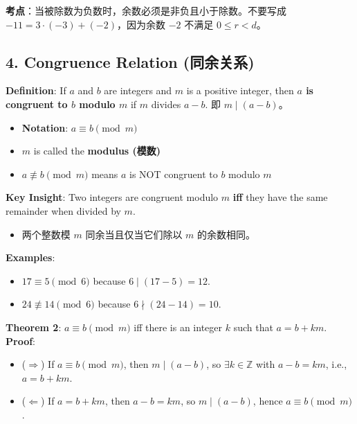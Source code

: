 \documentclass[10pt,a4paper,openany]{ctexbook}
\theoremstyle{definition}
\theoremstyle{remark}
\renewenvironment{quote}
  {\list{}{\leftmargin=1em\rightmargin=0pt\topsep=0.5pt\partopsep=0pt}\item[]}
  {\endlist}
\begin{document}
\begin{quote}
\textbf{考点}：当被除数为负数时，余数必须是非负且小于除数。不要写成 $-11 = 3 \cdot (-3) + (-2)$，因为余数 $-2$ 不满足 $0 \leq r < d$。

\end{quote}
\vspace{-2pt}

\subsection{4. Congruence Relation (同余关系)}

\textbf{Definition}: If $a$ and $b$ are integers and $m$ is a positive integer, then \textbf{$a$ is congruent to $b$ modulo $m$} if $m$ divides $a - b$. 即 $m \mid (a - b)$。
\begin{itemize}
\item \textbf{Notation}: $a \equiv b \pmod{m}$
\item $m$ is called the \textbf{modulus (模数)}
\item $a \not\equiv b \pmod{m}$ means $a$ is NOT congruent to $b$ modulo $m$

\end{itemize}

\textbf{Key Insight}: Two integers are congruent modulo $m$ \textbf{iff} they have the same remainder when divided by $m$.
\begin{itemize}
\item 两个整数模 $m$ 同余当且仅当它们除以 $m$ 的余数相同。

\end{itemize}

\textbf{Examples}:
\begin{itemize}
\item $17 \equiv 5 \pmod{6}$ because $6 \mid (17 - 5) = 12$.
\item $24 \not\equiv 14 \pmod{6}$ because $6 \nmid (24 - 14) = 10$.

\end{itemize}

\textbf{Theorem 2}: $a \equiv b \pmod{m}$ iff there is an integer $k$ such that $a = b + km$.
\textbf{Proof}:
\begin{itemize}
\item ($\Rightarrow$) If $a \equiv b \pmod{m}$, then $m \mid (a - b)$, so $\exists k \in \mathbb{Z}$ with $a - b = km$, i.e., $a = b + km$.
\item ($\Leftarrow$) If $a = b + km$, then $a - b = km$, so $m \mid (a - b)$, hence $a \equiv b \pmod{m}$.

\end{itemize}
\end{document}
